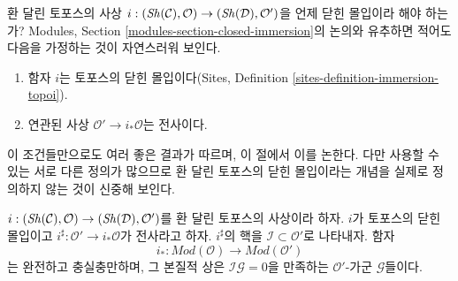 \noindent
환 달린 토포스의 사상
$i : (\mathop{\mathit{Sh}}\nolimits(\mathcal{C}), \mathcal{O}) \to (\mathop{\mathit{Sh}}\nolimits(\mathcal{D}), \mathcal{O}')$을
언제 닫힌 몰입이라 해야 하는가? Modules, Section
\ref{modules-section-closed-immersion}의 논의와 유추하면 적어도 다음을
가정하는 것이 자연스러워 보인다.
\begin{enumerate}
\item 함자 $i$는 토포스의 닫힌 몰입이다(Sites, Definition
\ref{sites-definition-immersion-topoi}).
\item 연관된 사상 $\mathcal{O}' \to i_*\mathcal{O}$는 전사이다.
\end{enumerate}
이 조건들만으로도 여러 좋은 결과가 따르며, 이 절에서 이를 논한다. 다만
사용할 수 있는 서로 다른 정의가 많으므로 환 달린 토포스의 닫힌 몰입이라는
개념을 실제로 정의하지 않는 것이 신중해 보인다.

\begin{lemma}
\label{lemma-i-star-equivalence}
$i : (\mathop{\mathit{Sh}}\nolimits(\mathcal{C}), \mathcal{O}) \to (\mathop{\mathit{Sh}}\nolimits(\mathcal{D}), \mathcal{O}')$를
환 달린 토포스의 사상이라 하자. $i$가 토포스의 닫힌 몰입이고
$i^\sharp : \mathcal{O}' \to i_*\mathcal{O}$가 전사라고 하자.
$i^\sharp$의 핵을 $\mathcal{I} \subset \mathcal{O}'$로 나타내자. 함자
$$
i_* :
\textit{Mod}(\mathcal{O})
\longrightarrow
\textit{Mod}(\mathcal{O}')
$$
는 완전하고 충실충만하며, 그 본질적 상은
$\mathcal{I}\mathcal{G} = 0$을 만족하는 $\mathcal{O}'$-가군
$\mathcal{G}$들이다.
\end{lemma}

